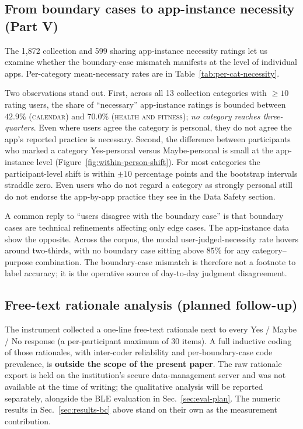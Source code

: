 \documentclass[11pt,a4paper]{article}
\begin{document}
\subsection{From boundary cases to app-instance necessity (Part V)}
\label{sec:results-app}

The 1{,}872 collection and 599 sharing app-instance necessity
ratings let us examine whether the boundary-case mismatch manifests
at the level of individual apps. Per-category mean-necessary rates
are in Table~\ref{tab:per-cat-necessity}.



Two observations stand out. First, across all 13 collection
categories with $\geq 10$ rating users, the share of ``necessary''
app-instance ratings is bounded between $42.9\%$ (\textsc{calendar})
and $70.0\%$ (\textsc{health and fitness}); \emph{no category
reaches three-quarters}. Even where users agree the category is
personal, they do not agree the app's reported practice is
necessary. Second, the difference between participants who marked a
category Yes-personal versus Maybe-personal is small at the
app-instance level (Figure~\ref{fig:within-person-shift}). For most
categories the participant-level shift is within $\pm 10$ percentage
points and the bootstrap intervals straddle zero. Even users who do
not regard a category as strongly personal still do not endorse the
app-by-app practice they see in the Data Safety section.



A common reply to ``users disagree with the boundary case'' is that
boundary cases are technical refinements affecting only edge cases.
The app-instance data show the opposite. Across the corpus, the
modal user-judged-necessity rate hovers around two-thirds, with no
boundary case sitting above $85\%$ for any
category--purpose combination. The boundary-case mismatch is therefore
not a footnote to label accuracy; it is the operative source of
day-to-day judgment disagreement.

\subsection{Free-text rationale analysis (planned follow-up)}
\label{sec:results-rationale}

The instrument collected a one-line free-text rationale next to
every Yes / Maybe / No response (a per-participant maximum of 30
items). A full inductive coding of those rationales, with
inter-coder reliability and per-boundary-case code prevalence, is
\textbf{outside the scope of the present paper}. The raw rationale
export is held on the institution's secure data-management server
and was not available at the time of writing; the qualitative
analysis will be reported separately, alongside the BLE evaluation
in Sec.~\ref{sec:eval-plan}. The numeric results in
Sec.~\ref{sec:results-bc} above stand on their own as the
measurement contribution.
\end{document}
